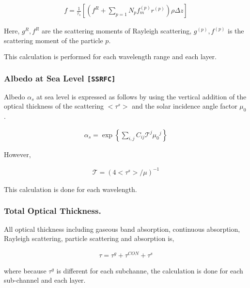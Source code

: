 \begin{eqnarray}
f = \frac{1}{\tau_s} \left[ 
    \left( f^R + \sum_{p=1}{N_p} f^{(p)}_m r^{(p)}\right) \rho \Delta z
    \right]
\end{eqnarray}

Here, \(g^R, f^R\) are the scattering moments of Rayleigh scattering,
\(g^{(p)}, f^{(p)}\) is the scattering moment of the particle \(p\).

This calculation is performed for each wavelength range and each layer.

\hypertarget{albedo-at-sea-level-ssrfc}{%
\subsubsection{\texorpdfstring{Albedo at Sea Level
\texttt{{[}SSRFC{]}}}{Albedo at Sea Level {[}SSRFC{]}}}
\label{albedo-at-sea-level-modulessrfc}}

Albedo \(\alpha_s\) at sea level is expressed as follows by using the 
vertical addition of the optical thickness of the scattering \(<\tau^{s}>\) 
and the solar incidence angle factor \(\mu_0\).

\begin{eqnarray}
  \alpha_s = \exp\left\{ \sum_{i,j} C_{ij} {\mathcal T}^j {\mu_0}^j \right\}
\end{eqnarray}

However,

\begin{eqnarray}
 {\mathcal T} = ( 4 <\tau^{s}>/\mu )^{-1}
\end{eqnarray}

This calculation is done for each wavelength.

\hypertarget{total-optical-thickness}{%
\subsubsection{Total Optical
Thickness.}\label{total-optical-thickness.}}

All optical thickness including gaseous band absorption, continuous 
absorption, Rayleigh scattering, particle scattering and absorption is,

\begin{eqnarray}
  \tau = \tau^g + \tau^{CON} + \tau^{s}
\end{eqnarray}

where because \(\tau^g\) is different for each subchanne, the calculation 
is done for each sub-channel and each layer.

